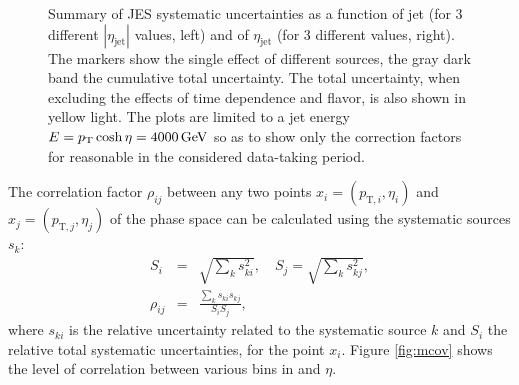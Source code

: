 \documentclass[11pt,twoside,a4paper,cmspaper,final,collab]{cms-tdr}
\begin{document}
\begin{figure}[htbp!]
\caption{\label{fig:total}
Summary of JES systematic uncertainties as a function of jet \pt (for 3 different $|\eta_\text{jet}|$ values, left) and of $\eta_\text{jet}$ (for 3 different \pt values, right).
The markers show the single effect of different sources, the gray dark band the cumulative total uncertainty. The total uncertainty, when excluding the effects of time dependence and flavor, is also shown in yellow light. The plots are limited to a jet energy $E=p_{\mathrm{T}}\cosh\eta=4000\,\text{Ge\hspace{-.08em}V}$ so as to show only the correction factors for reasonable \pt in the considered data-taking period.
}
\end{figure}

The correlation factor $\rho_{ij}$ between any two points $x_i=(p_{\mathrm{T},i},\eta_i)$ and $x_j=(p_{\mathrm{T},j},\eta_j)$ of the phase space can be calculated using the systematic sources $s_k$:
\begin{eqnarray}\label{eq:mcov}\nonumber
S_{i} &=& \sqrt{\sum_k s_{ki}^2},\quad
S_{j} = \sqrt{\sum_k s_{kj}^2},\\
\rho_{ij} &=& \frac{\sum_k s_{ki} s_{kj}}{S_{i}S_{j}},
\end{eqnarray}
where $s_{ki}$ is the relative uncertainty related to the systematic source $k$ and $S_{i}$ the relative total systematic uncertainties, for the point $x_i$.
Figure \ref{fig:mcov} shows the level of correlation between various bins in \pt and $\eta$.
\end{document}
